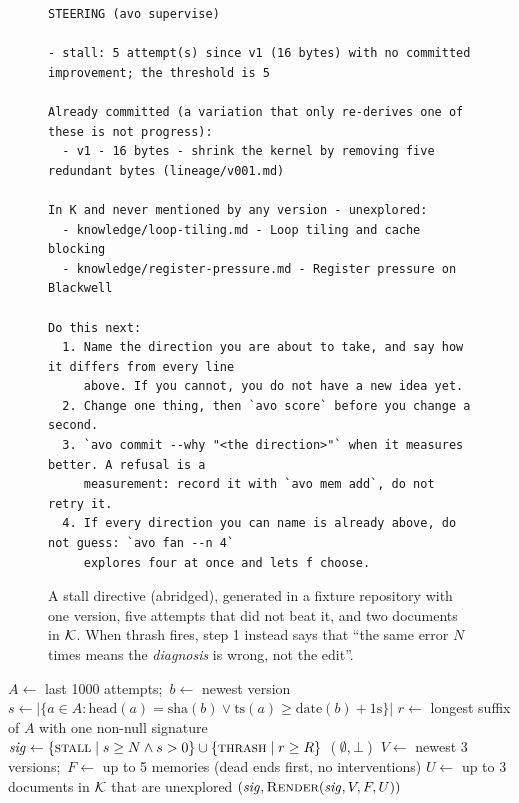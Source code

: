 \begin{figure}[t]
\begin{lstlisting}
STEERING (avo supervise)

- stall: 5 attempt(s) since v1 (16 bytes) with no committed improvement; the threshold is 5

Already committed (a variation that only re-derives one of these is not progress):
  - v1 - 16 bytes - shrink the kernel by removing five redundant bytes (lineage/v001.md)

In K and never mentioned by any version - unexplored:
  - knowledge/loop-tiling.md - Loop tiling and cache blocking
  - knowledge/register-pressure.md - Register pressure on Blackwell

Do this next:
  1. Name the direction you are about to take, and say how it differs from every line
     above. If you cannot, you do not have a new idea yet.
  2. Change one thing, then `avo score` before you change a second.
  3. `avo commit --why "<the direction>"` when it measures better. A refusal is a
     measurement: record it with `avo mem add`, do not retry it.
  4. If every direction you can name is already above, do not guess: `avo fan --n 4`
     explores four at once and lets f choose.
\end{lstlisting}
\caption{A stall directive (abridged), generated in a fixture repository with one version, five
attempts that did not beat it, and two documents in $\mathcal{K}$. When thrash fires, step 1 instead says
that ``the same error $N$ times means the \emph{diagnosis} is wrong, not the edit''.}
\label{fig:directive}
\end{figure}

\begin{algorithm}[t]
\caption{\textsc{Supervise}($N, R$)}
\label{alg:supervise}
\begin{algorithmic}[1]
\State $A \gets$ last 1000 attempts;\ $b \gets$ newest version
\State $s \gets |\{a \in A : \mathrm{head}(a) = \mathrm{sha}(b) \vee \mathrm{ts}(a) \geq \mathrm{date}(b) + 1\mathrm{s}\}|$
\State $r \gets$ longest suffix of $A$ with one non-null signature
\State $\mathit{sig} \gets \{\textsc{stall} \mid s \geq N \wedge s > 0\} \cup \{\textsc{thrash} \mid r \geq R\}$
 \Return $(\emptyset, \bot)$ \EndIf
\State $V \gets$ newest 3 versions;\ $F \gets$ up to 5 memories (dead ends first, no interventions)
\State $U \gets$ up to 3 documents in $\mathcal{K}$ that are unexplored
\State \Return $(\mathit{sig}, \Call{Render}{\mathit{sig}, V, F, U})$ 
\end{algorithmic}
\end{algorithm}

